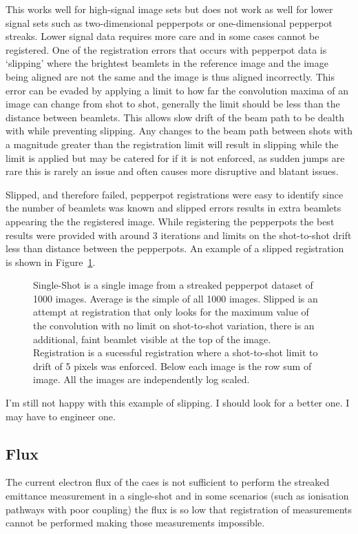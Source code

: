 This works well for high-signal image sets but does not work as well for lower signal sets such as two-dimensional pepperpots or one-dimensional pepperpot streaks.
Lower signal data requires more care and in some cases cannot be registered.
One of the registration errors that occurs with pepperpot data is `slipping' where the brightest beamlets in the reference image and the image being aligned are not the same and the image is thus aligned incorrectly.
This error can be evaded by applying a limit to how far the convolution maxima of an image can change from shot to shot, generally the limit should be less than the distance between beamlets.
This allows slow drift of the beam path to be dealth with while preventing slipping.
Any changes to the beam path between shots with a magnitude greater than the registration limit will result in slipping while the limit is applied but may be catered for if it is not enforced, as sudden jumps are rare this is rarely an issue and often causes more disruptive and blatant issues.

Slipped, and therefore failed, pepperpot registrations were easy to identify since the number of beamlets was known and slipped errors results in extra beamlets appearing the the registered image.
While registering the pepperpots the best results were provided with around 3 iterations and limits on the shot-to-shot drift less than distance between the pepperpots.
An example of a slipped registration is shown in Figure~\ref{figure:registration_examples}.

\begin{figure}
    \center
    
    \caption{Single-Shot is a single image from a streaked pepperpot dataset of 1000 images. Average is the simple of all 1000 images. Slipped is an attempt at registration that only looks for the maximum value of the convolution with no limit on shot-to-shot variation, there is an additional, faint beamlet visible at the top of the image. Registration is a sucessful registration where a shot-to-shot limit to drift of 5 pixels was enforced. Below each image is the row sum of image. All the images are independently log scaled.}
    \label{figure:registration_examples}
\end{figure}

{\color{red} I'm still not happy with this example of slipping. I should look for a better one. I may have to engineer one.}

\subsection{Flux}
The current electron flux of the \gls{caes} is not sufficient to perform the streaked emittance measurement in a single-shot and in some scenarios (such as ionisation pathways with poor coupling) the flux is so low that registration of measurements cannot be performed making those measurements impossible.


